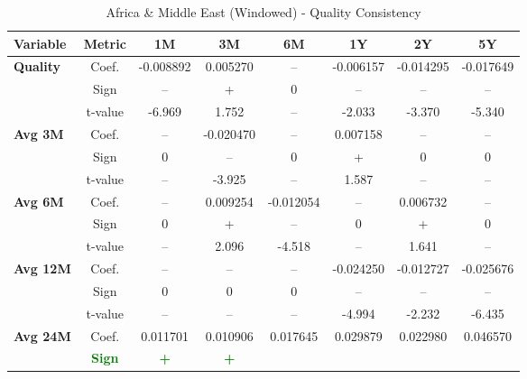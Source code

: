 \documentclass[11pt,english,a4paper,hidelinks]{book}
\begin{document}
\begin{table}[H]
    \centering
    \caption{Africa \& Middle East (Windowed) - Quality Consistency}
    \begin{tabular}{lccccccc}
        \toprule
        \textbf{Variable} & \textbf{Metric} & \textbf{1M} & \textbf{3M} & \textbf{6M} & \textbf{1Y} & \textbf{2Y} & \textbf{5Y} \\
        \midrule
        \multirow{3}{*}{\textbf{Quality}}
            & Coef.   & -0.008892 & 0.005270  & --        & -0.006157 & -0.014295 & -0.017649 \\
            & Sign    & –         & +         & 0         & –         & –         & –         \\
            & t-value & -6.969    & 1.752     & --        & -2.033    & -3.370    & -5.340    \\
        \cmidrule{1-8}
        \multirow{3}{*}{\textbf{Avg 3M}}
            & Coef.   & --        & -0.020470 & --        & 0.007158  & --        & --        \\
            & Sign    & 0         & –         & 0         & +         & 0         & 0         \\
            & t-value & --        & -3.925    & --        & 1.587     & --        & --        \\
        \cmidrule{1-8}
        \multirow{3}{*}{\textbf{Avg 6M}}
            & Coef.   & --        & 0.009254  & -0.012054 & --        & 0.006732  & --        \\
            & Sign    & 0         & +         & –         & 0         & +         & 0         \\
            & t-value & --        & 2.096     & -4.518    & --        & 1.641     & --        \\
        \cmidrule{1-8}
        \multirow{3}{*}{\textbf{Avg 12M}}
            & Coef.   & --        & --        & --        & -0.024250 & -0.012727 & -0.025676 \\
            & Sign    & 0         & 0         & 0         & –         & –         & –         \\
            & t-value & --        & --        & --        & -4.994    & -2.232    & -6.435    \\
        \cmidrule{1-8}
        \multirow{3}{*}{\textbf{Avg 24M}}
            & Coef.   & 0.011701  & 0.010906  & 0.017645  & 0.029879  & 0.022980  & 0.046570  \\
            & \textbf{\textcolor{green}{Sign}}
                     & \textbf{\textcolor{green}{+}}
                     & \textbf{\textcolor{green}{+}}

\end{tabular}
\end{table}
\end{document}
